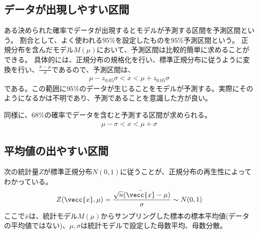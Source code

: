 \subsection{データが出現しやすい区間}
ある決められた確率でデータが出現するとモデルが予測する区間を予測区間という。
割合として、よく使われる$95\%$を設定したものを$95\%$予測区間という。
正規分布を含んだモデル$M(\mu)$において、予測区間は比較的簡単に求めることができる。
具体的には、正規分布の規格化を行い、標準正規分布に従うように変換を行い、$\frac{x-\mu}{\sigma}$であるので、予測区間は、
\begin{eqnarray*}
    \mu-z_{0.05}\sigma < x < \mu+z_{0.05}\sigma
\end{eqnarray*}
である。この範囲に$95\%$のデータが生じることをモデルが予測する。実際にそのようになるかは不明であり、予測であることを意識した方が良い。

同様に、$68\%$の確率でデータを含むと予測する区間が求められる。
\begin{eqnarray*}
    \mu-\sigma < x < \mu+\sigma
\end{eqnarray*}






\subsection{平均値の出やすい区間}
次の統計量$Z$が標準正規分布$N(0,1)$に従うことが、正規分布の再生性によってわかっている。
$$
Z(\vecc{x},\mu)=\frac{\sqrt{n}(\bar{\vecc{x}}-\mu)}{\sigma} \sim N(0,1)
$$
ここで$\bar{x}$は、統計モデル$M(\mu)$からサンプリングした標本の標本平均値(データの平均値ではない)、$\mu,\sigma$は統計モデルで設定した母数平均、母数分散。

